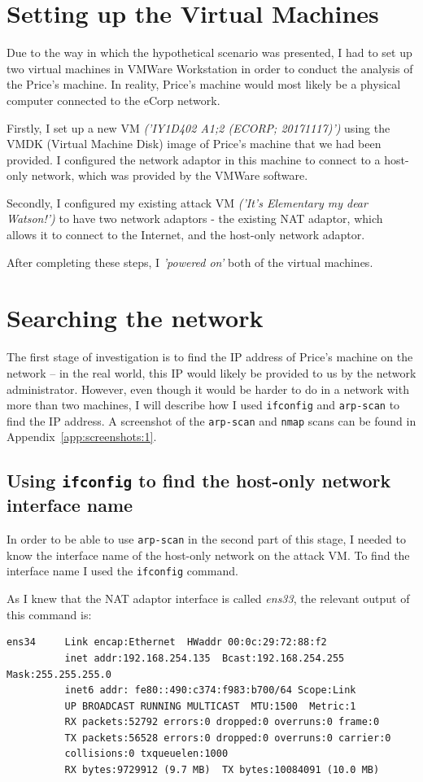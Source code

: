 \documentclass[12pt]{report}
\newcommand{\term}[1]{\colorbox{light-gray}{\texttt{#1}}}
\begin{document}
\section*{Setting up the Virtual Machines}
Due to the way in which the hypothetical scenario was presented, I had to set up two virtual machines in VMWare Workstation in order to conduct the analysis of the Price's machine. In reality, Price's machine would most likely be a physical computer connected to the eCorp network.

Firstly, I set up a new VM \textit{('IY1D402 A1;2 (ECORP; 20171117)')} using the VMDK (Virtual Machine Disk) image of Price's machine that we had been provided. I configured the network adaptor in this machine to connect to a host-only network, which was provided by the VMWare software.

Secondly, I configured my existing attack VM \textit{('It's Elementary my dear Watson!')} to have two network adaptors - the existing NAT adaptor, which allows it to connect to the Internet, and the host-only network adaptor.

After completing these steps, I \textit{'powered on'} both of the virtual machines.


\section{Searching the network}
The first stage of investigation is to find the IP address of Price's machine on the network -- in the real world, this IP would likely be provided to us by the network administrator. However, even though it would be harder to do in a network with more than two machines, I will describe how I used \texttt{ifconfig} and \texttt{arp-scan} to find the IP address. A screenshot of the \texttt{arp-scan} and \texttt{nmap} scans can be found in Appendix~\ref{app:screenshots:1}.

\subsection*{Using \texttt{ifconfig} to find the host-only network interface name}
In order to be able to use \texttt{arp-scan} in the second part of this stage, I needed to know the interface name of the host-only network on the attack VM. To find the interface name I used the \term{ifconfig} command.

As I knew that the NAT adaptor interface is called \textit{ens33}, the relevant output of this command is:
\begin{Verbatim}[frame=leftline]
ens34     Link encap:Ethernet  HWaddr 00:0c:29:72:88:f2
          inet addr:192.168.254.135  Bcast:192.168.254.255  Mask:255.255.255.0
          inet6 addr: fe80::490:c374:f983:b700/64 Scope:Link
          UP BROADCAST RUNNING MULTICAST  MTU:1500  Metric:1
          RX packets:52792 errors:0 dropped:0 overruns:0 frame:0
          TX packets:56528 errors:0 dropped:0 overruns:0 carrier:0
          collisions:0 txqueuelen:1000
          RX bytes:9729912 (9.7 MB)  TX bytes:10084091 (10.0 MB)
\end{Verbatim}
\end{document}
